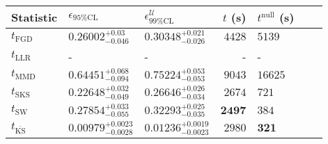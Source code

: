 \begin{tabular}{l|llr|llr}
	Statistic & $\epsilon_{95\%\mathrm{CL}}$ & $\epsilon^    {\mathcal{U}}_{99\%\mathrm{CL}}$ & $t$ (s) & $t^{\mathrm{null}}$ (s) \\
	\midrule
	$t_{\mathrm{FGD}}$ & $0.26002_{-0.046}^{+0.03}$ & $0.30348_{-0.026}^{+0.021}$ & $4428$ & $5139$ \\
	$t_{\mathrm{LLR}}$ & - & - & - & - \\
	$t_{\mathrm{MMD}}$ & $0.64451_{-0.094}^{+0.068}$ & $0.75224_{-0.053}^{+0.053}$ & $9043$ & $16625$ \\
	$t_{\mathrm{SKS}}$ & $0.22648_{-0.049}^{+0.032}$ & $0.26646_{-0.034}^{+0.026}$ & $2674$ & $721$ \\
	$t_{\mathrm{SW}}$ & $0.27854_{-0.055}^{+0.033}$ & $0.32293_{-0.035}^{+0.025}$ & ${\mathbf{2497}}$ & $384$ \\
	$t_{\overline{\mathrm{KS}}}$ & ${\mathbf{0.00979_{-0.0028}^{+0.0023}}}$ & ${\mathbf{0.01236_{-0.0023}^{+0.0019}}}$ & $2980$ & ${\mathbf{321}}$ \\
	\bottomrule
\end{tabular}